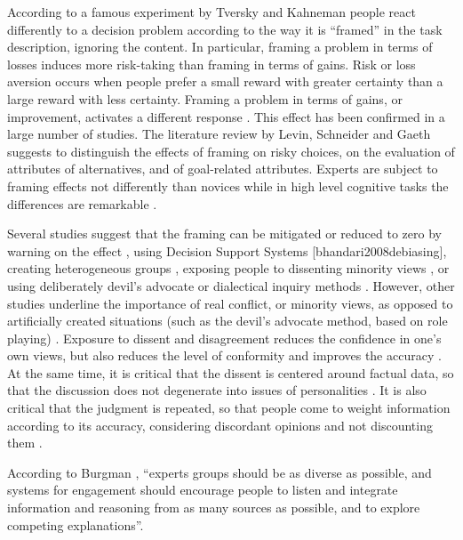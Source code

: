 \documentclass[]{book}
\begin{document}
According to a famous experiment by Tversky and Kahneman
\citep{tversky1981framing} people react differently to a decision
problem according to the way it is ``framed'' in the task description,
ignoring the content. In particular, framing a problem in terms of
losses induces more risk-taking than framing in terms of gains. Risk or
loss aversion occurs when people prefer a small reward with greater
certainty than a large reward with less certainty. Framing a problem in
terms of gains, or improvement, activates a different response
\citep{tversky1981framing}. This effect has been confirmed in a large
number of studies. The literature review by Levin, Schneider and Gaeth
\citep{levin1998all} suggests to distinguish the effects of framing on
risky choices, on the evaluation of attributes of alternatives, and of
goal-related attributes. Experts are subject to framing effects not
differently than novices \citep{loke1992effects} while in high level
cognitive tasks the differences are remarkable \citep{larkin1980expert}.

Several studies suggest that the framing can be mitigated or reduced to
zero by warning on the effect \citep{cheng2010debiasing}, using Decision
Support Systems {[}bhandari2008debiasing{]}, creating heterogeneous
groups \citep{yaniv2011group}, exposing people to dissenting minority
views \citep{nemeth1988modelling}, or using deliberately devil's
advocate or dialectical inquiry methods \citep{lord1984considering}.
However, other studies underline the importance of real conflict, or
minority views, as opposed to artificially created situations (such as
the devil's advocate method, based on role playing)
\citep{goodwin2010limits}. Exposure to dissent and disagreement reduces
the confidence in one's own views, but also reduces the level of
conformity and improves the accuracy \citep{nemeth2001devil}. At the
same time, it is critical that the dissent is centered around factual
data, so that the discussion does not degenerate into issues of
personalities \citep{keay2012authorising}. It is also critical that the
judgment is repeated, so that people come to weight information
according to its accuracy, considering discordant opinions and not
discounting them \citep{harries2004combining}.

According to Burgman \citep{burgman2015trusting}, ``experts groups
should be as diverse as possible, and systems for engagement should
encourage people to listen and integrate information and reasoning from
as many sources as possible, and to explore competing explanations''.
\end{document}
